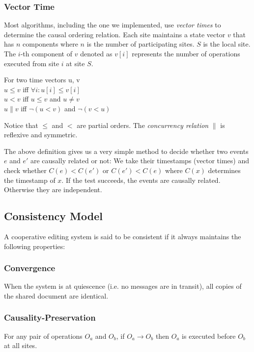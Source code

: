 \subsubsection{Vector Time}
Most algorithms, including the one we implemented,
use \emph{vector times} to determine the causal ordering relation. Each site
maintains a state vector $v$ that has $n$ components where $n$ is the number of 
participating sites. $S$ is the local site. The $i$-th component of $v$ denoted 
as $v[i]$ represents the number of operations executed from site $i$ at site 
$S$. 

\begin{defn}
  For two time vectors u, v \\
  $u \leq v$ iff $\forall i : u[i] \leq v[i]$ \\
  $u < v$ iff $u \leq v$ and $u \not= v$ \\
  $u \parallel v$ iff $\neg(u < v)$ and $\neg(v < u)$
\end{defn}

Notice that $\leq$ and $<$ are partial orders. The \emph{concurrency relation} 
$\parallel$ is reflexive and symmetric.

The above definition gives us a very simple method to decide whether two events 
$e$ and $e'$ are causally related or not: We take their timestamps (vector 
times) and check whether $C(e) < C(e')$ or $C(e') < C(e)$ where $C(x)$ 
determines the timestamp of $x$. If the test succeeds, the events are causally 
related. Otherwise they are independent.


\subsection{Consistency Model}
A cooperative editing system is said to be consistent if it always maintains the
following properties:

\subsubsection{Convergence} 
When the system is at quiescence (i.e. no messages are
in transit), all copies of the shared document are identical.

\subsubsection{Causality-Preservation} 
For any pair of operations $O_a$ and $O_b$,
if $O_a \rightarrow O_b$ then $O_a$ is executed before $O_b$ at all sites.

